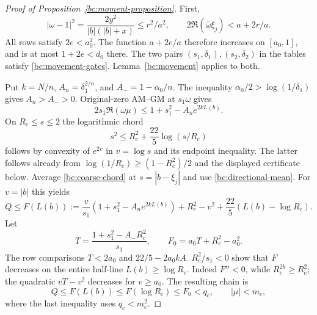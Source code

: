 \begin{proof}[Proof of Proposition~\ref{bc:moment-proposition}]
First,
\[
 |\omega-1|^2=\frac{2y^2}{|b|(|b|+x)}\leq r^2/a^2,
 \qquad
 2\Re(\overline\omega\xi_j)<a+2r/a.
\]
All rows satisfy $2e<a_0^2$.  The function $a+2e/a$ therefore
increases on $[a_0,1]$, and is at most $1+2e<d_0$ there.
The two pairs $(s_1,\delta_1),(s_2,\delta_2)$ in the tables satisfy
\eqref{bc:movement-gates}.  Lemma~\ref{bc:movement} applies to both.

Put $k=N/n$, $A_n=\delta_1^{2/n}$, and
$A_-=1-\alpha_0/n$.  The inequality
$\alpha_0/2>\log(1/\delta_1)$ gives $A_n>A_->0$.
Original-zero AM--GM at $s_1\omega$ gives
\begin{equation}\label{bc:directional-mean}
 2s_1\Re(\overline\omega\mu)
 \leq1+s_1^2-A_n e^{2kL(b)}.
\end{equation}
On $R_c\leq s\leq2$ the logarithmic chord
\begin{equation}\label{bc:coarse-chord}
 s^2\leq R_c^2+\frac{22}5\log(s/R_c)
\end{equation}
follows by convexity of $e^{2v}$ in $v=\log s$ and its endpoint
inequality.  The latter follows already from
$\log(1/R_c)\geq(1-R_c^2)/2$ and the displayed certificate below.
Average \eqref{bc:coarse-chord} at $s=|b-\xi_j|$ and use
\eqref{bc:directional-mean}.  For $v=|b|$ this yields
\begin{equation}\label{bc:F-definition}
 Q\leq F(L(b)):=
 \frac v{s_1}(1+s_1^2-A_ne^{2kL(b)})+R_c^2-v^2
     +\frac{22}5(L(b)-\log R_c).
\end{equation}
Let
\[
 T=\frac{1+s_1^2-A_-R_c^2}{s_1},\qquad
 F_0=a_0T+R_c^2-a_0^2.
\]
The row comparisons $T<2a_0$ and
$22/5-2a_0kA_-R_c^2/s_1<0$ show that $F$ decreases on the
entire half-line $L(b)\geq\log R_c$.  Indeed $F''<0$, while
$R_c^{2k}\geq R_c^2$; the quadratic $vT-v^2$ decreases for
$v\geq a_0$.  The resulting chain is
\begin{equation}\label{bc:coarse-correct-chain}
 Q\leq F(L(b))\leq F(\log R_c)\leq F_0<q_c,
 \qquad |\mu|<m_c,
\end{equation}
where the last inequality uses $q_c<m_c^2$.


\end{proof}
